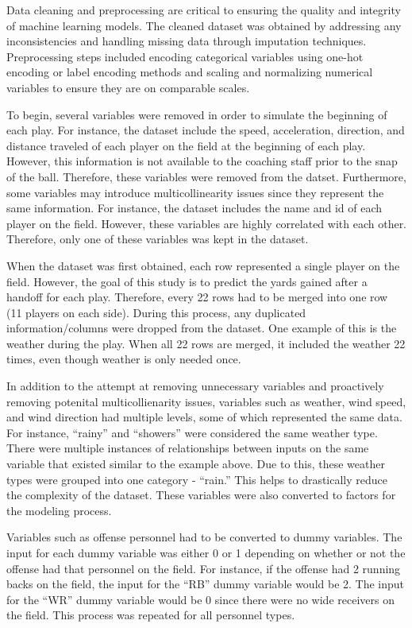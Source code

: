 \documentclass[
  super,
  preprint,
  3p]{elsarticle}
\begin{document}
Data cleaning and preprocessing are critical to ensuring the quality and
integrity of machine learning models. The cleaned dataset was obtained
by addressing any inconsistencies and handling missing data through
imputation techniques. Preprocessing steps included encoding categorical
variables using one-hot encoding or label encoding methods and scaling
and normalizing numerical variables to ensure they are on comparable
scales.

To begin, several variables were removed in order to simulate the
beginning of each play. For instance, the dataset include the speed,
acceleration, direction, and distance traveled of each player on the
field at the beginning of each play. However, this information is not
available to the coaching staff prior to the snap of the ball.
Therefore, these variables were removed from the datset. Furthermore,
some variables may introduce multicollinearity issues since they
represent the same information. For instance, the dataset includes the
name and id of each player on the field. However, these variables are
highly correlated with each other. Therefore, only one of these
variables was kept in the dataset.

When the dataset was first obtained, each row represented a single
player on the field. However, the goal of this study is to predict the
yards gained after a handoff for each play. Therefore, every 22 rows had
to be merged into one row (11 players on each side). During this
process, any duplicated information/columns were dropped from the
dataset. One example of this is the weather during the play. When all 22
rows are merged, it included the weather 22 times, even though weather
is only needed once.

In addition to the attempt at removing unnecessary variables and
proactively removing potenital multicollienarity issues, variables such
as weather, wind speed, and wind direction had multiple levels, some of
which represented the same data. For instance, ``rainy'' and ``showers''
were considered the same weather type. There were multiple instances of
relationships between inputs on the same variable that existed similar
to the example above. Due to this, these weather types were grouped into
one category - ``rain.'' This helps to drastically reduce the complexity
of the dataset. These variables were also converted to factors for the
modeling process.

Variables such as offense personnel had to be converted to dummy
variables. The input for each dummy variable was either 0 or 1 depending
on whether or not the offense had that personnel on the field. For
instance, if the offense had 2 running backs on the field, the input for
the ``RB'' dummy variable would be 2. The input for the ``WR'' dummy
variable would be 0 since there were no wide receivers on the field.
This process was repeated for all personnel types.
\end{document}
